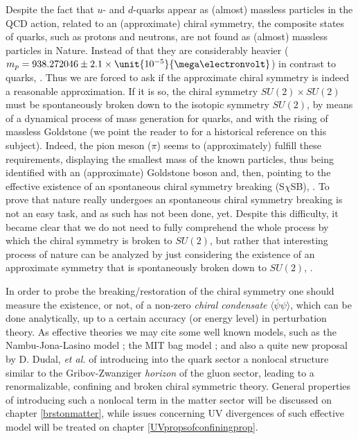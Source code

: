 Despite the fact that $u$- and $d$-quarks appear as (almost) massless particles in the QCD
action, related to an (approximate) chiral symmetry, the composite states of quarks, such as
protons and neutrons, are not found as (almost) massless particles in Nature. Instead of
that they are considerably heavier ($m_{p} = 938.272046 \pm 2.1\times
\unit{10^{-5}}{\mega\electronvolt}$) in contrast to quarks,
\cite{Roberts:1994dr,Agashe:2014kda}. Thus we are forced to ask if the approximate chiral
symmetry is indeed a reasonable approximation. If it is so, the chiral symmetry
$SU(2)\times SU(2)$ must be spontaneously broken down to the isotopic symmetry $SU(2)$, by
means of a dynamical process of mass generation for quarks, and with the rising of
massless Goldstone (we point the reader to \cite{'tHooft:1979bh,Banks:1979yr}
for a historical reference on this subject). Indeed, the pion meson ($\pi$) seems to
(approximately) fulfill these requirements, displaying the smallest mass of the known
particles, thus being identified with an (approximate) Goldstone boson and, then, pointing to
the effective existence of an spontaneous chiral symmetry breaking (S$\chi$SB),
\cite{Weinberg:1996kr,Peskin:1995ev,Ryder:1985wq}. To prove that nature really undergoes an
spontaneous chiral symmetry breaking is not an easy task, and as such has not been done, yet.
Despite this difficulty, it became clear that we do not need to fully comprehend the whole
process by which the chiral symmetry is broken to $SU(2)$, but rather that interesting process
of nature can be analyzed by just considering the existence of an approximate symmetry that is
spontaneously broken down to $SU(2)$,
\cite{'tHooft:1979bh,Banks:1979yr,Alexandru:2012sd,Weinberg:1996kr,Peskin:1995ev,Ryder:1985wq}.

In order to probe the breaking/restoration of the chiral symmetry one should measure the
existence, or not, of a non-zero \emph{chiral condensate} $\langle \bar{\psi}\psi \rangle$,
which can be done analytically, up to a certain accuracy (or energy level) in perturbation
theory. As effective theories we may cite some well known models, such as the Nambu-Jona-Lasino
model \cite{Nambu:1961tp,Volkov:2005kw,Palhares:2012fv,Fukushima:2003fw}; the MIT bag model
\cite{Palhares:2012fv,Canfora:2013zna,Bellac:2011kqa,Chodos:1974pn,DeTar:1979vb}; and also a quite new proposal by D. Dudal,
\emph{et al.} \cite{Dudal:2013vha} of introducing into the quark sector a nonlocal structure
similar to the Gribov-Zwanziger \emph{horizon} of the gluon sector, leading to a
renormalizable, confining and broken chiral symmetric theory. General properties of introducing
such a nonlocal term in the matter sector will be discussed on chapter \ref{brstonmatter},
while issues concerning UV divergences of such effective model will be treated on chapter
\ref{UVpropsofconfiningprop}.









%
